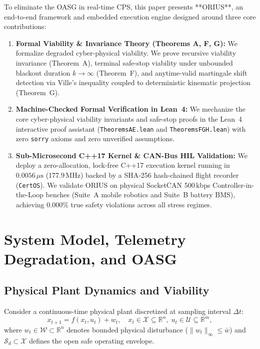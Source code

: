\documentclass[conference]{IEEEtran}
\begin{document}
To eliminate the OASG in real-time CPS, this paper presents **ORIUS**, an end-to-end framework and embedded execution engine designed around three core contributions:
\begin{enumerate}
    \item \textbf{Formal Viability \& Invariance Theory (Theorems A, F, G):} We formalize degraded cyber-physical viability. We prove recursive viability invariance (Theorem~A), terminal safe-stop viability under unbounded blackout duration $k \to \infty$ (Theorem~F), and anytime-valid martingale shift detection via Ville's inequality coupled to deterministic kinematic projection (Theorem~G).
    \item \textbf{Machine-Checked Formal Verification in Lean~4:} We mechanize the core cyber-physical viability invariants and safe-stop proofs in the Lean~4 interactive proof assistant (\texttt{TheoremsAE.lean} and \texttt{TheoremsFGH.lean}) with zero \texttt{sorry} axioms and zero unverified assumptions.
    \item \textbf{Sub-Microsecond C++17 Kernel \& CAN-Bus HIL Validation:} We deploy a zero-allocation, lock-free C++17 execution kernel running in $0.0056\,\mu\text{s}$ (177.9\,MHz) backed by a SHA-256 hash-chained flight recorder (\texttt{CertOS}). We validate ORIUS on physical SocketCAN 500\,kbps Controller-in-the-Loop benches (Suite~A mobile robotics and Suite~B battery BMS), achieving $0.000\%$ true safety violations across all stress regimes.
\end{enumerate}

\section{System Model, Telemetry Degradation, and OASG}

\subsection{Physical Plant Dynamics and Viability}
Consider a continuous-time physical plant discretized at sampling interval $\Delta t$:
\begin{equation}
x_{t+1} = f(x_t, u_t) + w_t, \quad x_t \in \mathcal{X} \subseteq \mathbb{R}^n, \; u_t \in \mathcal{U} \subseteq \mathbb{R}^m,
\end{equation}
where $w_t \in \mathcal{W} \subset \mathbb{R}^n$ denotes bounded physical disturbance ($\|w_t\|_\infty \le \bar{w}$) and $\mathcal{S}_d \subset \mathcal{X}$ defines the open safe operating envelope.
\end{document}
